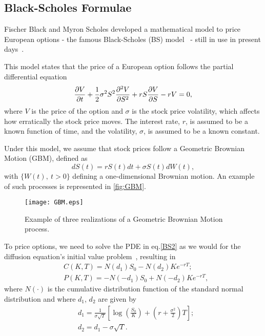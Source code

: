 \subsection{Black-Scholes Formulae}
Fischer Black and Myron Scholes developed a mathematical model to price European options - the famous Black-Scholes (BS) model~\citep{Scholes} - still in use in present days~\citep{Wilmott3}.

This model states that the price of a European option follows the partial differential equation
\begin{equation}\label{BS2}
\pdv{V}{t}+\frac{1}{2}\sigma^2S^2\pdv{^2V}{S^2}+rS\pdv{V}{S}-rV=0,
\end{equation}
\noindent where $V$ is the price of the option and $\sigma$ is the stock price volatility, which affects how erratically the stock price moves. The interest rate, $r$, is assumed to be a known function of time, and the volatility, $\sigma$, is assumed to be a known constant.

Under this model, we assume that stock prices follow a Geometric Brownian Motion (GBM), defined as
\begin{equation}\label{GBM}
dS(t)=rS(t)dt+\sigma S(t)dW(t),
\end{equation}
\noindent with $\{W(t),\ t>0\}$ defining a one-dimensional Brownian motion. An example of such processes is represented in \autoref{fig:GBM}.

\begin{figure}[H]
    \centering
      \texttt{[image: GBM.eps]}
      \caption{Example of three realizations of a Geometric Brownian Motion process.}\label{fig:GBM}
    \end{figure}
    
To price options, we need to solve the PDE in eq.\eqref{BS2} as we would for the diffusion equation's initial value problem~\citep{Dilao}, resulting in
\begin{subequations}\label{callputBS}
\begin{align}
&C(K,T)=N(d_1)S_0-N(d_2)Ke^{-rT};\\
&P(K,T)=-N(-d_1)S_0+N(-d_2)Ke^{-rT},
\end{align}
\end{subequations}
\noindent where $N(\cdot)$ is the cumulative distribution function of the standard normal distribution and where $d_1$, $d_2$ are given by
\begin{subequations}\label{d1d2}
\begin{align}
&d_1=\frac{1}{\sigma\sqrt{T}}\left[\log\left(\frac{S_0}{K}\right)+\left(r+\frac{\sigma^2}{2}\right)T\right];\\
&d_2=d_1-\sigma\sqrt{T}.
\end{align}
\end{subequations}


